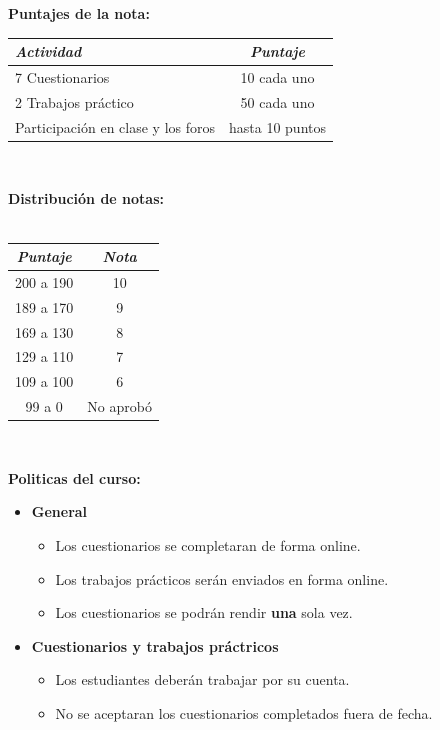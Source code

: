 \documentclass[11pt]{article}
\begin{document}
\textbf {\large Puntajes de la nota:} \\
\begin{center}
\begin{tabular}{lc}
    \emph{Actividad} & \emph{Puntaje} \\
    \toprule
7 Cuestionarios & 10 cada uno\\
2 Trabajos práctico & 50 cada uno \\
Participación en clase y los foros & hasta 10 puntos \\
\end{tabular} \\
\end{center}
\textbf {\large Distribuci\'on de notas:} \\\\
\begin{center}
\begin{tabular}{cc}
    \emph{Puntaje} & \emph{Nota}\\
    \toprule
    200 a 190 & 10 \\ 189 a 170 & 9 \\
    169 a 130 & 8  \\ 129 a 110 & 7 \\
    109 a 100 & 6  \\ 99 a   0 & No aprobó
\end{tabular} \\
\end{center}
\textbf {\large Politicas del curso:}
\begin{itemize}
	\item \textbf {General}
		\begin{itemize}
			\item Los cuestionarios se completaran de forma online.
      \item Los trabajos prácticos serán enviados en forma online.
			\item Los cuestionarios se podrán rendir \textbf{una} sola vez.
		\end{itemize}
	\item \textbf {Cuestionarios y trabajos pr\'actricos}
		\begin{itemize}
			\item Los estudiantes deberán trabajar por su cuenta.
			\item No se aceptaran los cuestionarios completados fuera de fecha.
		\end{itemize}
\end{itemize}
\end{document}
